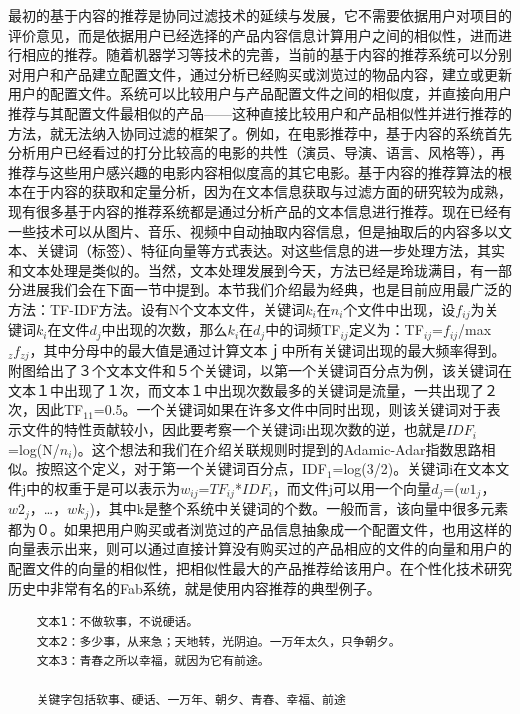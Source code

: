 \begin{enumerate}[(1)]
	最初的基于内容的推荐是协同过滤技术的延续与发展\citep{recmd_content_based}，它不需要依据用户对项目的评价意见，而是依据用户已经选择的产品内容信息计算用户之间的相似性，进而进行相应的推荐。随着机器学习等技术的完善，当前的基于内容的推荐系统可以分别对用户和产品建立配置文件，通过分析已经购买或浏览过的物品内容，建立或更新用户的配置文件。系统可以比较用户与产品配置文件之间的相似度，并直接向用户推荐与其配置文件最相似的产品——这种直接比较用户和产品相似性并进行推荐的方法，就无法纳入协同过滤的框架了。例如，在电影推荐中，基于内容的系统首先分析用户已经看过的打分比较高的电影的共性（演员、导演、语言、风格等），再推荐与这些用户感兴趣的电影内容相似度高的其它电影。基于内容的推荐算法的根本在于内容的获取和定量分析，因为在文本信息获取与过滤方面的研究较为成熟，现有很多基于内容的推荐系统都是通过分析产品的文本信息进行推荐。现在已经有一些技术可以从图片、音乐、视频中自动抽取内容信息，但是抽取后的内容多以文本、关键词（标签）、特征向量等方式表达。对这些信息的进一步处理方法，其实和文本处理是类似的。当然，文本处理发展到今天，方法已经是玲珑满目，有一部分进展我们会在下面一节中提到。本节我们介绍最为经典，也是目前应用最广泛的方法：TF-IDF方法。设有N个文本文件，关键词$k_{i}$在$n_{i}$个文件中出现，设$f_{ij}$为关键词$k_i$在文件$d_j$中出现的次数，那么$k_i$在$d_j$中的词频TF$_{ij}$定义为：TF$_{ij}$=$f_{ij}$/max$_zf_{zj}$，其中分母中的最大值是通过计算文本ｊ中所有关键词出现的最大频率得到。附图给出了３个文本文件和５个关键词，以第一个关键词百分点为例，该关键词在文本１中出现了１次，而文本１中出现次数最多的关键词是流量，一共出现了２次，因此TF$_{11}$=0.5。一个关键词如果在许多文件中同时出现，则该关键词对于表示文件的特性贡献较小，因此要考察一个关键词i出现次数的逆，也就是$IDF_{i}$=log(N/$n_{i}$)。这个想法和我们在介绍关联规则时提到的Adamic-Adar指数思路相似。按照这个定义，对于第一个关键词百分点，IDF$_1$=log(3/2)。关键词i在文本文件j中的权重于是可以表示为$w_{ij}$=$TF_{ij}$*$IDF_{i}$，而文件j可以用一个向量$d_{j}$=($w1_{j}$，$w2_{j}$，…，$wk_{j}$)，其中k是整个系统中关键词的个数。一般而言，该向量中很多元素都为０。如果把用户购买或者浏览过的产品信息抽象成一个配置文件，也用这样的向量表示出来，则可以通过直接计算没有购买过的产品相应的文件的向量和用户的配置文件的向量的相似性，把相似性最大的产品推荐给该用户。在个性化技术研究历史中非常有名的Fab系统，就是使用内容推荐的典型例子。
	\begin{lstlisting}
	文本1：不做软事，不说硬话。
	文本2：多少事，从来急；天地转，光阴迫。一万年太久，只争朝夕。
	文本3：青春之所以幸福，就因为它有前途。

	关键字包括软事、硬话、一万年、朝夕、青春、幸福、前途
	\end{lstlisting}


\end{enumerate}
